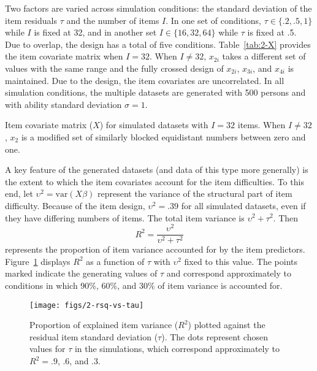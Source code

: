 Two factors are varied across simulation conditions: the standard deviation of the item residuals $\tau$ and the number of items $I$. In one set of conditions, 
$\tau \in \{.2, .5, 1\}$ while $I$ is fixed at 32, 
and in another set 
$I \in \{16, 32, 64\}$ while $\tau$ is fixed at .5.
Due to overlap, the design has a total of five conditions. Table~\ref{tab:2-X} provides the item covariate matrix when $I=32$. When $I \ne 32$, $x_{2i}$ takes a different set of values with the same range and the fully crossed design of $x_{2i}$, $x_{3i}$, and $x_{4i}$ is maintained. Due to the design, the item covariates are uncorrelated. In all simulation conditions, the multiple datasets are generated with 500 persons and with ability standard deviation $\sigma = 1$.

\begin{table}
	\label{tab:2-X}
	\centering
	
	\caption{Item covariate matrix ($X$) for simulated datasets with $I = 32$ items. When $I \ne 32$, $x_2$ is a modified set of similarly blocked equidistant numbers between zero and one.}
\end{table}

A key feature of the generated datasets (and data of this type more generally) is the
extent to which the item covariates account for the item difficulties. To this end, let 
$\upsilon^2 = \mathrm{var}(X\beta)$ 
represent the variance of the structural part of item difficulty. Because of the item design, $\upsilon^2 = .39$ for all simulated datasets, even if they have differing numbers of items. The total item variance is 
$\upsilon^2 + \tau^2$. Then
\begin{equation} 
	R^2 = \frac{\upsilon^2}{\upsilon^2 + \tau^2}
\end{equation}
represents the proportion of item variance accounted for by the item predictors. Figure~\ref{fig:2-rsq-vs-tau} displays $R^2$ as a function of $\tau$ with $\upsilon^2$ fixed to this value. The points marked indicate the generating values of $\tau$ and correspond approximately to conditions in which 90\%, 60\%, and 30\% of item variance is accounted for.

\begin{figure}[tbp]
	\label{fig:2-rsq-vs-tau}
	\centering
	\texttt{[image: figs/2-rsq-vs-tau]}
	\caption{Proportion of explained item variance ($R^2$) plotted against the residual item standard deviation ($\tau$). The dots represent chosen values for $\tau$ in the simulations, which correspond approximately to $R^2 = .9$, .6, and .3.}
\end{figure}


